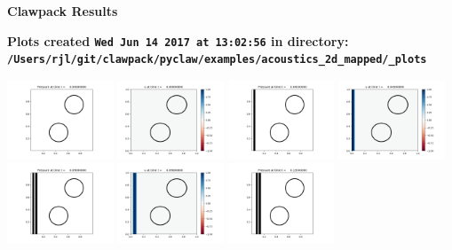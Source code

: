 \documentclass[11pt]{article}
\begin{document}
        \begin{center}{\Large\bf Clawpack Results}\vskip 5pt
        
        \bf Plots created {\tt Wed Jun 14 2017 at 13:02:56} in directory: \vskip 5pt
        \verb+/Users/rjl/git/clawpack/pyclaw/examples/acoustics_2d_mapped/_plots+
        \end{center}
        \vskip 5pt
        \includegraphics[width=0.2375\textwidth]{frame0000fig0.png}
\includegraphics[width=0.2375\textwidth]{frame0000fig1.png}
\includegraphics[width=0.2375\textwidth]{frame0001fig0.png}
\includegraphics[width=0.2375\textwidth]{frame0001fig1.png}
\vskip 10pt 
\includegraphics[width=0.2375\textwidth]{frame0002fig0.png}
\includegraphics[width=0.2375\textwidth]{frame0002fig1.png}
\includegraphics[width=0.2375\textwidth]{frame0003fig0.png}
\end{document}
